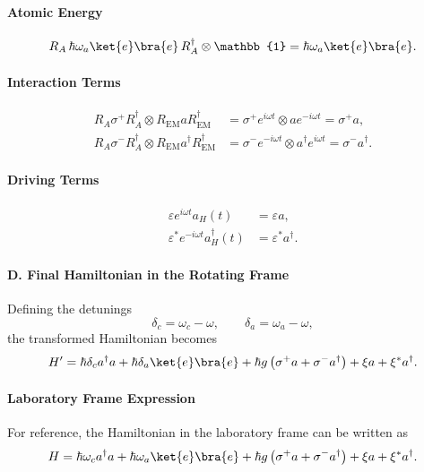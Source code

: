 \paragraph{Atomic Energy}
\begin{equation}
R_A \, \hbar \omega_a \ket{e}\bra{e} \, R_A^\dagger \otimes \mathbb{1}
=
\hbar \omega_a \ket{e}\bra{e}.
\end{equation}

\paragraph{Interaction Terms}
\begin{align}
R_A \sigma^+ R_A^\dagger \otimes R_{\mathrm{EM}} a R_{\mathrm{EM}}^\dagger
&=
\sigma^+ e^{i\omega t} \otimes a e^{-i\omega t}
=
\sigma^+ a , \\
R_A \sigma^- R_A^\dagger \otimes R_{\mathrm{EM}} a^\dagger R_{\mathrm{EM}}^\dagger
&=
\sigma^- e^{-i\omega t} \otimes a^\dagger e^{i\omega t}
=
\sigma^- a^\dagger .
\end{align}

\paragraph{Driving Terms}
\begin{align}
\varepsilon e^{i\omega t} a_H(t) &= \varepsilon a , \\
\varepsilon^* e^{-i\omega t} a_H^\dagger(t) &= \varepsilon^* a^\dagger .
\end{align}

\paragraph{D. Final Hamiltonian in the Rotating Frame}

Defining the detunings
\[
\delta_c = \omega_c - \omega,
\qquad
\delta_a = \omega_a - \omega,
\]
the transformed Hamiltonian becomes
\begin{equation}\label{eq:rwaham}
H'
=
\hbar \delta_c a^\dagger a
+
\hbar \delta_a \ket{e}\bra{e}
+
\hbar g \left( \sigma^+ a + \sigma^- a^\dagger \right)
+
\xi a
+
\xi^* a^\dagger .
\end{equation}

\paragraph{Laboratory Frame Expression}

For reference, the Hamiltonian in the laboratory frame can be written as
\begin{equation}
H
=
\hbar \omega_c a^\dagger a
+
\hbar \omega_a \ket{e}\bra{e}
+
\hbar g \left( \sigma^+ a + \sigma^- a^\dagger \right)
+
\xi a
+
\xi^* a^\dagger .
\end{equation}


